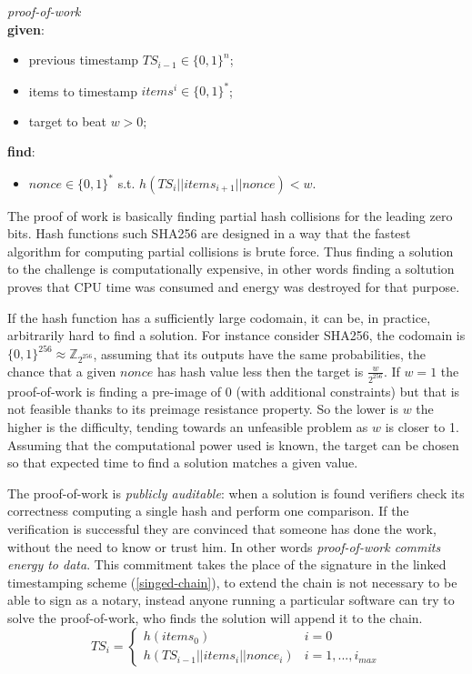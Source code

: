 \begin{mydef}{\textit{proof-of-work}}
\label{pow}
\\
\textbf{given}:
\begin{itemize}
	\item previous timestamp $TS_{i-1} \in \{0,1\}^n$;
	\item items to timestamp $items^i \in \{0,1\}^*$;
	\item target to beat $w>0$;
\end{itemize}
\textbf{find}:
\begin{itemize}
	\item $nonce \in \{0,1\}^*$ s.t. $h(TS_i || items_{i+1} || nonce) < w$.
\end{itemize}
\end{mydef}

The proof of work is basically finding partial hash collisions for the leading zero bits. Hash functions such SHA256 are designed in a way that the fastest algorithm for computing partial collisions is brute force. Thus finding a solution to the challenge is computationally expensive, in other words finding a soltution proves that CPU time was consumed and energy was destroyed for that purpose.
 
If the hash function has a sufficiently large codomain, it can be, in practice, arbitrarily hard to find a solution. For instance consider SHA256, the codomain is $\{0,1\}^{256} \approx \mathbb{Z}_{2^{256}}$, assuming that its outputs have the same probabilities, the chance that a given $nonce$ has hash value less then the target is $\frac{w}{2^{256}}$.  
If $w=1$ the proof-of-work is finding a pre-image of 0 (with additional constraints) but that is not feasible thanks to its preimage resistance property. 
So the lower is $w$ the higher is the difficulty, tending towards an unfeasible problem as $w$ is closer to 1. 
Assuming that the computational power used is known, the target can be chosen so that expected time to find a solution matches a given value.

The proof-of-work is \textit{publicly auditable}: when a solution is found verifiers check its correctness computing a single hash and perform one comparison. If the verification is successful they are convinced that someone has done the work, without the need to know or trust him. In other words \textit{proof-of-work commits energy to data}.
This commitment takes the place of the signature in the linked timestamping scheme (\ref{singed-chain}), to extend the chain is not necessary to be able to sign as a notary, instead anyone running a particular software can try to solve the proof-of-work, who finds the solution will append it to the chain. 
\begin{equation}
\label{chain-nonce}
TS_i =   
\begin{cases} 
h(items_0) & i=0\\ 
 h(TS_{i-1}||items_i||nonce_i) & i=1, ..., i_{max} 
\end{cases}
\end{equation}

